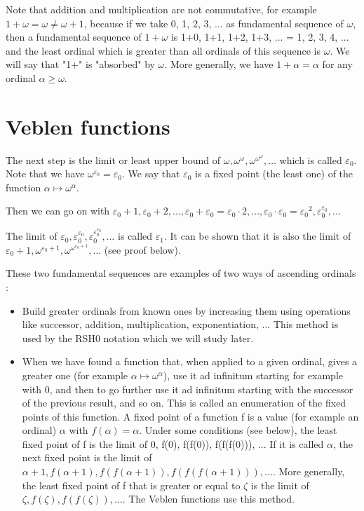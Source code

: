 \documentclass[10pt]{article}
\begin{document}
Note that addition and multiplication are not commutative, for example \( 1+\omega = \omega \neq \omega+1 \), because if we take 0, 1, 2, 3, ... as fundamental sequence of \( \omega \), then a fundamental sequence of \( 1+\omega \) is 1+0, 1+1, 1+2, 1+3, ... = 1, 2, 3, 4, ... and the least ordinal which is greater than all ordinals of this sequence is \( \omega \). We will say that "1+" is "absorbed" by \( \omega \). More generally, we have \( 1+\alpha = \alpha \) for any ordinal \( \alpha \geq \omega \).

\section{Veblen functions}

The next step is the limit or least upper bound of \( \omega, \omega^\omega, \omega^{\omega^\omega}, \ldots \) which is called \( \varepsilon_0 \). Note that we have \( \omega^{\varepsilon_0} = \varepsilon_0 \). We say that \( \varepsilon_0 \) is a fixed point (the least one) of the function \( \alpha \mapsto \omega^\alpha \).

Then we can go on with \( \varepsilon_0+1, \varepsilon_0+2, \ldots, \varepsilon_0+\varepsilon_0 = \varepsilon_0 \cdot 2, \ldots, \varepsilon_0 \cdot \varepsilon_0 = {\varepsilon_0}^2, \varepsilon_0^{\varepsilon_0}, ...\)

The limit of \( \varepsilon_0, \varepsilon_0^{\varepsilon_0}, \varepsilon_0^{\varepsilon_0^{\varepsilon_0}}, \ldots \) is called \( \varepsilon_1 \). It can be shown that it is also the limit of \( \varepsilon_0+1, \omega^{\varepsilon_0+1}, \omega^{\omega^{\varepsilon_0+1}}, \ldots \) (see proof below).

These two fundamental sequences are examples of two ways of ascending ordinals :
\begin{itemize}
     \setlength{\itemsep}{1pt}
     \setlength{\parskip}{0pt}
     \setlength{\parsep}{0pt}
\item Build greater ordinals from known ones by increasing them using operations like successor, addition, multiplication, exponentiation, ... This method is used by the RSH0 notation which we will study later.

\item When we have found a function that, when applied to a given ordinal, gives a greater one (for example \( \alpha \mapsto \omega^\alpha \)), use it ad infinitum starting for example with 0, and then to go further use it ad infinitum starting with the successor of the previous result, and so on. This is called an enumeration of the fixed points of this function. A fixed point of a function f is a value (for example an ordinal) \( \alpha \) with \( f(\alpha) = \alpha \). Under some conditions (see below), the least fixed point of f is the limit of 0, f(0), f(f(0)), f(f(f(0))), ... If it is called \( \alpha \), the next fixed point is the limit of \( \alpha+1, f(\alpha+1), f(f(\alpha+1)), f(f(f(\alpha+1))), \ldots \).
More generally, the least fixed point of f that is greater or equal to \( \zeta \) is the limit of \( \zeta, f(\zeta), f(f(\zeta)), \ldots\).
The Veblen functions use this method.

\end{itemize}
\end{document}
